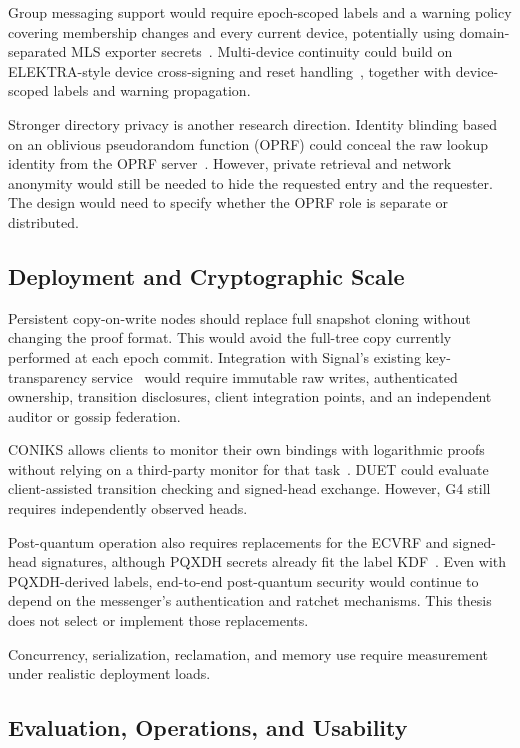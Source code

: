 Group messaging support would require epoch-scoped labels and a warning policy covering membership
changes and every current device, potentially using domain-separated MLS exporter
secrets~\cite[Section~8.5]{rfc9420}. Multi-device continuity could build on ELEKTRA-style device cross-signing and reset
handling~\cite{len2023elektra}, together with device-scoped labels and warning propagation.

Stronger directory privacy is another research direction. Identity blinding based on an oblivious
pseudorandom function (OPRF) could conceal the raw lookup identity from the OPRF
server~\cite[Sections~1 and~7.1]{rfc9497}. However,
private retrieval and network anonymity would still be needed to hide the requested entry and the
requester. The design would need to specify whether the OPRF role is separate or distributed.

\subsection{Deployment and Cryptographic Scale}

Persistent copy-on-write nodes should replace full snapshot cloning without changing the proof
format. This would avoid the full-tree copy currently performed at each epoch commit. Integration
with Signal's existing key-transparency service~\cite{signal-kt-server} would require immutable raw
writes, authenticated ownership, transition disclosures, client integration points, and an
independent auditor or gossip federation.

CONIKS allows clients to monitor their own bindings with logarithmic proofs without relying on a
third-party monitor for that task~\cite{melara2015coniks}. DUET could evaluate
client-assisted transition checking and signed-head exchange. However, G4 still requires
independently observed heads.

Post-quantum operation also requires replacements for the ECVRF and signed-head signatures,
although PQXDH secrets already fit the label KDF~\cite[Sections~2.2 and 3.3]{pqxdh}. Even with
PQXDH-derived labels, end-to-end post-quantum security would continue to depend on the messenger's
authentication and ratchet mechanisms. This thesis does not select or implement those replacements.

Concurrency, serialization, reclamation, and memory use require measurement under realistic
deployment loads.

\subsection{Evaluation, Operations, and Usability}

